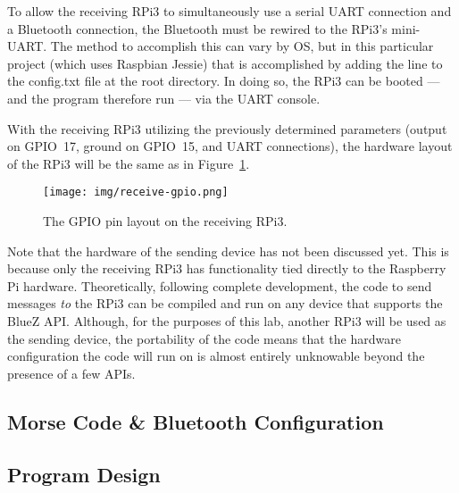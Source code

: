 \documentclass[11pt]{article}
\begin{document}
To allow the receiving RPi3 to simultaneously use a serial UART connection and a Bluetooth connection, the Bluetooth must be rewired to the RPi3's mini-UART.
The method to accomplish this can vary by OS, but in this particular project (which uses Raspbian Jessie) that is accomplished by adding the line  to the config.txt file at the root directory.
In doing so, the RPi3 can be booted --- and the program therefore run --- via the UART console.


With the receiving RPi3 utilizing the previously determined parameters (output on GPIO~17, ground on GPIO~15, and UART connections), the hardware layout of the RPi3 will be the same as in Figure~\ref{fig:receive-gpio}.


\begin{figure}
    \centering
    \texttt{[image: img/receive-gpio.png]}
    \caption{The GPIO pin layout on the receiving RPi3.}
    \label{fig:receive-gpio}
\end{figure}


Note that the hardware of the sending device has not been discussed yet.
This is because only the receiving RPi3 has functionality tied directly to the Raspberry Pi hardware.
Theoretically, following complete development, the code to send messages \emph{to} the RPi3 can be compiled and run on any device that supports the BlueZ API.
Although, for the purposes of this lab, another RPi3 will be used as the sending device, the portability of the code means that the hardware configuration the code will run on is almost entirely unknowable beyond the presence of a few APIs.


\subsection{Morse Code \& Bluetooth Configuration}
\label{sub:morse_code_&_bluetooth_configuration}




\subsection{Program Design}
\label{sub:program_design}


\end{document}
